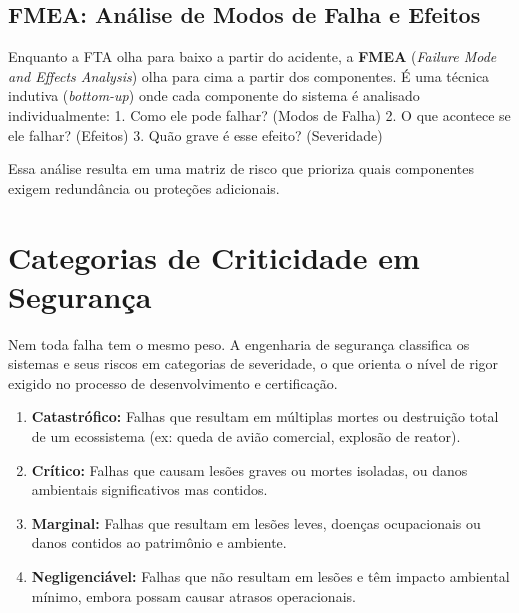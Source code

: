 \documentclass[12pt,a4paper,twoside]{report}
\begin{document}
\subsection{FMEA: Análise de Modos de Falha e Efeitos}

Enquanto a FTA olha para baixo a partir do acidente, a \textbf{FMEA} (\emph{Failure Mode and Effects Analysis}) olha para cima a partir dos componentes. É uma técnica indutiva (\emph{bottom-up}) onde cada componente do sistema é analisado individualmente:
1.  Como ele pode falhar? (Modos de Falha)
2.  O que acontece se ele falhar? (Efeitos)
3.  Quão grave é esse efeito? (Severidade)

Essa análise resulta em uma matriz de risco que prioriza quais componentes exigem redundância ou proteções adicionais.

\section{Categorias de Criticidade em Segurança}

Nem toda falha tem o mesmo peso. A engenharia de segurança classifica os sistemas e seus riscos em categorias de severidade, o que orienta o nível de rigor exigido no processo de desenvolvimento e certificação.

\begin{enumerate}
    \item \textbf{Catastrófico:} Falhas que resultam em múltiplas mortes ou destruição total de um ecossistema (ex: queda de avião comercial, explosão de reator).
    \item \textbf{Crítico:} Falhas que causam lesões graves ou mortes isoladas, ou danos ambientais significativos mas contidos.
    \item \textbf{Marginal:} Falhas que resultam em lesões leves, doenças ocupacionais ou danos contidos ao patrimônio e ambiente.
    \item \textbf{Negligenciável:} Falhas que não resultam em lesões e têm impacto ambiental mínimo, embora possam causar atrasos operacionais.
\end{enumerate}
\end{document}
